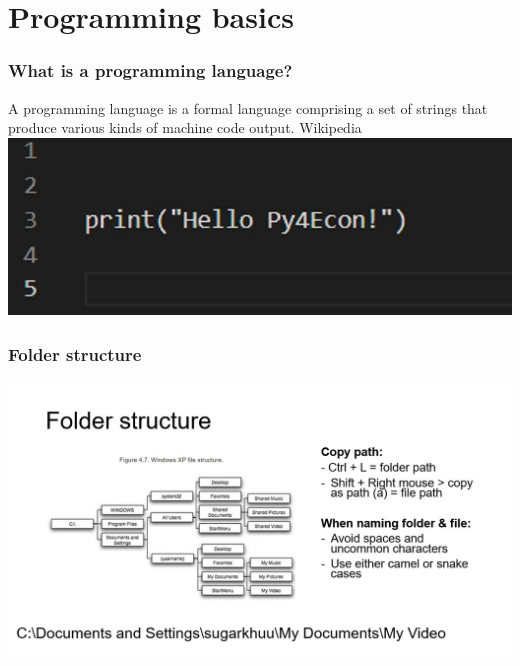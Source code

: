 \documentclass{beamer}
\begin{document}
\section{Programming basics} 
\frame{\tableofcontents[currentsection]}

\begin{frame}
    \frametitle{What is a programming language?}
    A programming language is a formal language comprising a set of strings 
    that produce various kinds of machine code output.
    Wikipedia \\
    \centering
    \includegraphics[scale = 0.3]{figures/hello.jpg}   
\end{frame}


\begin{frame}
    \frametitle{Folder structure}
    \centering
    \includegraphics[scale = 0.5]{figures/folder.jpg}
\end{frame}
\end{document}
